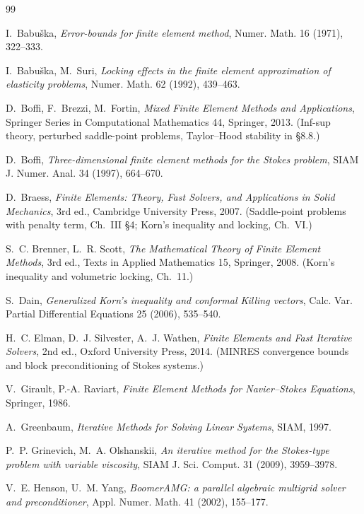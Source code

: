 \documentclass[11pt]{article}
\numberwithin{equation}{section}
\theoremstyle{remark}
\begin{document}
\begin{thebibliography}{99}

I.~Babuška,
\emph{Error-bounds for finite element method},
Numer. Math. 16 (1971), 322--333.

I.~Babuška, M.~Suri,
\emph{Locking effects in the finite element approximation of elasticity
problems},
Numer. Math. 62 (1992), 439--463.

D.~Boffi, F.~Brezzi, M.~Fortin,
\emph{Mixed Finite Element Methods and Applications},
Springer Series in Computational Mathematics 44, Springer, 2013.
(Inf-sup theory, perturbed saddle-point problems, Taylor--Hood stability
in \S8.8.)

D.~Boffi,
\emph{Three-dimensional finite element methods for the Stokes problem},
SIAM J. Numer. Anal. 34 (1997), 664--670.

D.~Braess,
\emph{Finite Elements: Theory, Fast Solvers, and Applications in Solid
Mechanics}, 3rd ed., Cambridge University Press, 2007.
(Saddle-point problems with penalty term, Ch.~III \S4; Korn's
inequality and locking, Ch.~VI.)

S.~C. Brenner, L.~R. Scott,
\emph{The Mathematical Theory of Finite Element Methods}, 3rd ed.,
Texts in Applied Mathematics 15, Springer, 2008.
(Korn's inequality and volumetric locking, Ch.~11.)

S.~Dain,
\emph{Generalized Korn's inequality and conformal Killing vectors},
Calc. Var. Partial Differential Equations 25 (2006), 535--540.

H.~C. Elman, D.~J. Silvester, A.~J. Wathen,
\emph{Finite Elements and Fast Iterative Solvers}, 2nd ed.,
Oxford University Press, 2014.
(MINRES convergence bounds and block preconditioning of Stokes systems.)

V.~Girault, P.-A. Raviart,
\emph{Finite Element Methods for Navier--Stokes Equations},
Springer, 1986.

A.~Greenbaum,
\emph{Iterative Methods for Solving Linear Systems}, SIAM, 1997.

P.~P. Grinevich, M.~A. Olshanskii,
\emph{An iterative method for the Stokes-type problem with variable
viscosity},
SIAM J. Sci. Comput. 31 (2009), 3959--3978.

V.~E. Henson, U.~M. Yang,
\emph{BoomerAMG: a parallel algebraic multigrid solver and
preconditioner},
Appl. Numer. Math. 41 (2002), 155--177.


\end{thebibliography}
\end{document}
